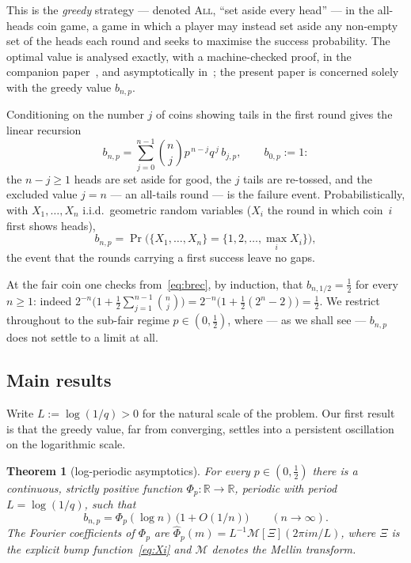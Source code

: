 \documentclass[11pt]{article}
\newtheorem{theorem}{Theorem}[section]
\theoremstyle{definition}
\newcommand{\All}{\textsc{All}}
\newcommand{\R}{\mathbb{R}}
\newcommand{\Mellin}{\mathcal{M}}
\begin{document}
This is the \emph{greedy} strategy --- denoted \All{}, ``set aside
every head'' --- in the all-heads coin game, a game in which a player
may instead set aside any non-empty set of the heads each round and
seeks to maximise the success probability. The optimal value is
analysed exactly, with a machine-checked proof, in the companion
paper~\cite{Paper1}, and asymptotically in~\cite{Paper3}; the present
paper is concerned solely with the greedy value $b_{n,p}$.

Conditioning on the number $j$ of coins showing tails in the first
round gives the linear recursion
\begin{equation}\label{eq:brec}
  b_{n,p}=\sum_{j=0}^{n-1}\binom nj p^{\,n-j}q^{\,j}\,b_{j,p},
  \qquad b_{0,p}:=1 :
\end{equation}
the $n-j\ge1$ heads are set aside for good, the $j$ tails are
re-tossed, and the excluded value $j=n$ --- an all-tails round --- is
the failure event. Probabilistically, with $X_1,\dots,X_n$ i.i.d.\
geometric random variables ($X_i$ the round in which coin~$i$ first
shows heads),
\[
  b_{n,p}=\Pr\bigl(\{X_1,\dots,X_n\}=\{1,2,\dots,\textstyle\max_iX_i\}
  \bigr),
\]
the event that the rounds carrying a first success leave no gaps.

At the fair coin one checks from~\eqref{eq:brec}, by induction, that
$b_{n,1/2}=\tfrac12$ for every $n\ge1$: indeed
$2^{-n}\bigl(1+\tfrac12\sum_{j=1}^{n-1}\binom nj\bigr)
=2^{-n}\bigl(1+\tfrac12(2^n-2)\bigr)=\tfrac12$. We restrict throughout
to the sub-fair regime $p\in(0,\tfrac12)$, where --- as we shall see
--- $b_{n,p}$ does not settle to a limit at all.

\subsection{Main results}\label{sec:main}

Write $L:=\log(1/q)>0$ for the natural scale of the problem. Our first
result is that the greedy value, far from converging, settles into a
persistent oscillation on the logarithmic scale.

\begin{theorem}[log-periodic asymptotics]\label{thm:main}
  For every $p\in(0,\tfrac12)$ there is a continuous, strictly positive
  function $\Phi_p:\R\to\R$, periodic with period $L=\log(1/q)$, such
  that
  \[
    b_{n,p}=\Phi_p(\log n)\,\bigl(1+O(1/n)\bigr)\qquad(n\to\infty).
  \]
  The Fourier coefficients of $\Phi_p$ are
  $\widehat\Phi_p(m)=L^{-1}\Mellin[\Xi](2\pi i m/L)$, where $\Xi$ is the
  explicit bump function~\eqref{eq:Xi} and $\Mellin$ denotes the Mellin
  transform.
\end{theorem}
\end{document}
